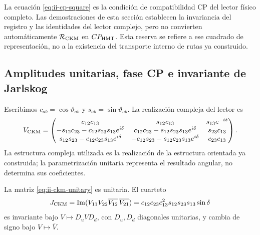 \begin{remark}
La ecuación \eqref{eq:ii-cp-square} es la condición de
compatibilidad CP del lector físico completo.
Las demostraciones de esta sección establecen la invariancia del
registro y las identidades del lector complejo, pero no convierten
automáticamente \(\mathcal R_{\rm CKM}\) en \(CP_{\rm HMT}\).
Esta reserva se refiere a ese cuadrado de representación, no a la
existencia del transporte interno de rutas ya construido.
\end{remark}

\subsection{Amplitudes unitarias, fase CP e invariante de Jarlskog}

Escribimos \(c_{ab}=\cos\vartheta_{ab}\) y
\(s_{ab}=\sin\vartheta_{ab}\). La realización compleja del lector es
\begingroup
\small
\setlength{\arraycolsep}{3pt}
\begin{equation}
 V_{\rm CKM}=
 \begin{pmatrix}
 c_{12}c_{13}&s_{12}c_{13}&s_{13}e^{-i\delta}\\
 -s_{12}c_{23}-c_{12}s_{23}s_{13}e^{i\delta}&
 c_{12}c_{23}-s_{12}s_{23}s_{13}e^{i\delta}&s_{23}c_{13}\\
 s_{12}s_{23}-c_{12}c_{23}s_{13}e^{i\delta}&
 -c_{12}s_{23}-s_{12}c_{23}s_{13}e^{i\delta}&c_{23}c_{13}
 \end{pmatrix}.
 \label{eq:ii-ckm-unitary}
\end{equation}
\endgroup
La estructura compleja utilizada es la realización de la estructura
orientada ya construida; la parametrización unitaria representa el resultado
angular, no determina sus coeficientes.

\begin{proposition}
La matriz \eqref{eq:ii-ckm-unitary} es unitaria. El cuarteto
\begin{equation}
 J_{\rm CKM}
 =\operatorname{Im}
   (V_{11}V_{22}\overline{V_{12}}\,\overline{V_{21}})
 =c_{12}c_{23}c_{13}^2s_{12}s_{23}s_{13}\sin\delta
 \label{eq:ii-jarlskog}
\end{equation}
es invariante bajo \(V\mapsto D_uVD_d\), con \(D_u,D_d\) diagonales
unitarias, y cambia de signo bajo \(V\mapsto\overline V\).
\end{proposition}

